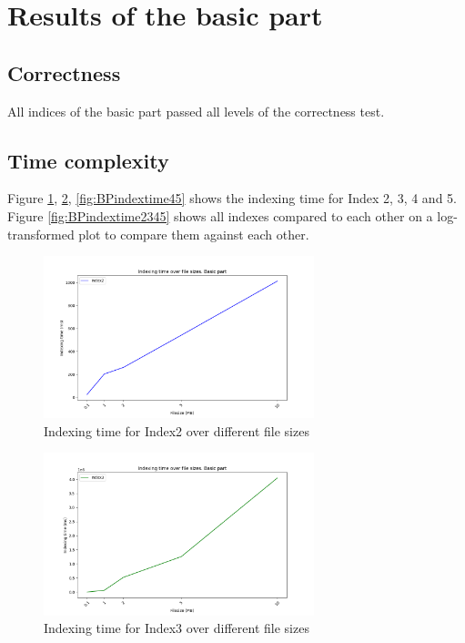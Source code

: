 \section{Results of the basic part}
\subsection{Correctness}
All indices of the basic part passed all levels of the correctness test.

\subsection{Time complexity}
Figure \ref{fig:BPindextime2}, \ref{fig:BPindextime3}, \ref{fig:BPindextime45} shows the indexing time for Index 2, 3, 4 and 5. Figure \ref{fig:BPindextime2345} shows all indexes compared to each other on a log-transformed plot to compare them against each other.

\begin{figure}[H]
    \centering
     \includegraphics[width=0.7\textwidth]{LaTeX/Pictures/Results/BPIndexing[2].png}
    \caption{Indexing time for Index2 over different file sizes}
    \label{fig:BPindextime2}
\end{figure}

\begin{figure}[H]
    \centering
    \includegraphics[width=0.7\textwidth]{LaTeX/Pictures/Results/BPIndexing[3].png}
    \caption{Indexing time for Index3 over different file sizes}
    \label{fig:BPindextime3}
\end{figure}

